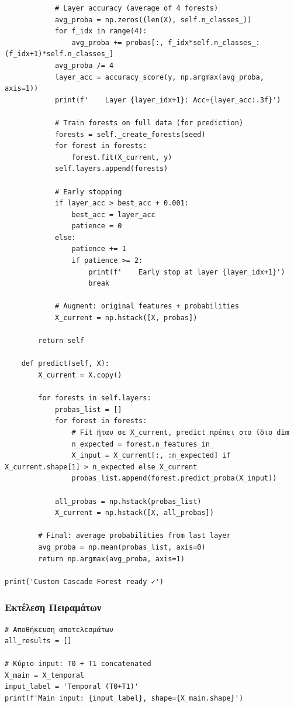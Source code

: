 \begin{lstlisting}
            # Layer accuracy (average of 4 forests)
            avg_proba = np.zeros((len(X), self.n_classes_))
            for f_idx in range(4):
                avg_proba += probas[:, f_idx*self.n_classes_:(f_idx+1)*self.n_classes_]
            avg_proba /= 4
            layer_acc = accuracy_score(y, np.argmax(avg_proba, axis=1))
            print(f'    Layer {layer_idx+1}: Acc={layer_acc:.3f}')
 
            # Train forests on full data (for prediction)
            forests = self._create_forests(seed)
            for forest in forests:
                forest.fit(X_current, y)
            self.layers.append(forests)
 
            # Early stopping
            if layer_acc > best_acc + 0.001:
                best_acc = layer_acc
                patience = 0
            else:
                patience += 1
                if patience >= 2:
                    print(f'    Early stop at layer {layer_idx+1}')
                    break
 
            # Augment: original features + probabilities
            X_current = np.hstack([X, probas])
 
        return self
 
    def predict(self, X):
        X_current = X.copy()
 
        for forests in self.layers:
            probas_list = []
            for forest in forests:
                # Fit ήταν σε X_current, predict πρέπει στο ίδιο dim
                n_expected = forest.n_features_in_
                X_input = X_current[:, :n_expected] if X_current.shape[1] > n_expected else X_current
                probas_list.append(forest.predict_proba(X_input))
 
            all_probas = np.hstack(probas_list)
            X_current = np.hstack([X, all_probas])
 
        # Final: average probabilities from last layer
        avg_proba = np.mean(probas_list, axis=0)
        return np.argmax(avg_proba, axis=1)
 
print('Custom Cascade Forest ready ✓')
\end{lstlisting}
 
\subsubsection*{Εκτέλεση Πειραμάτων}
 
\begin{lstlisting}
# Αποθήκευση αποτελεσμάτων
all_results = []
 
# Κύριο input: T0 + T1 concatenated
X_main = X_temporal
input_label = 'Temporal (T0+T1)'
print(f'Main input: {input_label}, shape={X_main.shape}')
\end{lstlisting}
 
